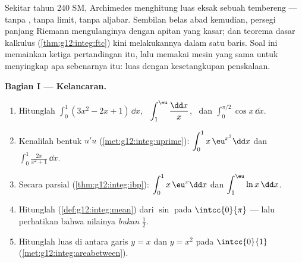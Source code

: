 \begin{problem}
\label{pb:g12:integ:1}
Sekitar tahun 240 SM, Archimedes menghitung luas eksak sebuah tembereng
 --- tanpa , tanpa limit, tanpa aljabar.
Sembilan belas abad kemudian, persegi panjang Riemann mengulanginya dengan
apitan yang kasar; dan teorema dasar kalkulus
(\cref{thm:g12:integ:ftc}) kini melakukannya dalam satu baris. Soal ini
memainkan ketiga pertandingan itu, lalu memakai mesin yang sama untuk
menyingkap apa sebenarnya  itu: luas dengan kesetangkupan penskalaan.

\medskip
\noindent\textbf{Bagian I --- Kelancaran.}
\begin{enumerate}
  \item Hitunglah $\displaystyle\int_0^1 (3x^2 - 2x + 1)\,\dd x$,
        \ $\displaystyle\int_1^{\eu} \frac{\dd x}{x}$, \ dan
        $\displaystyle\int_0^{\pi/2} \cos x\,\dd x$.
  \item Kenalilah bentuk $u'u$
        (\cref{met:g12:integ:uprime}):
        $\displaystyle\int_0^1 x\,\eu^{x^2}\dd x$ dan
        $\displaystyle\int_0^1 \frac{2x}{x^2 + 1}\,\dd x$.
  \item Secara parsial (\cref{thm:g12:integ:ibp}):
        $\displaystyle\int_0^1 x\,\eu^x \dd x$ dan
        $\displaystyle\int_1^{\eu} \ln x\,\dd x$.
  \item Hitunglah 
        (\cref{def:g12:integ:mean}) dari $\sin$ pada
        $\intcc{0}{\pi}$ --- lalu perhatikan bahwa nilainya \emph{bukan}
        $\frac12$.
  \item Hitunglah luas di antara garis $y = x$ dan
         $y = x^2$ pada $\intcc{0}{1}$
        (\cref{met:g12:integ:areabetween}).
\end{enumerate}


\end{problem}
